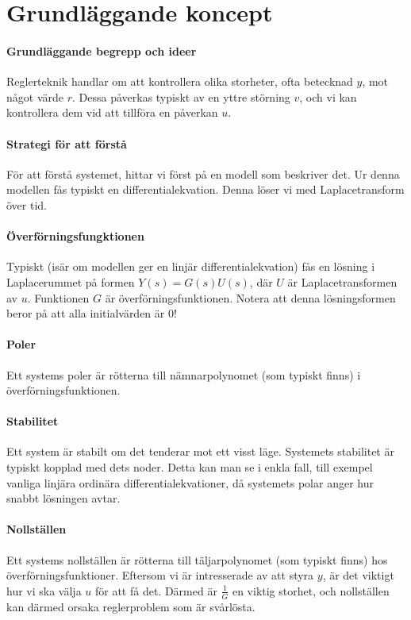 \section{Grundläggande koncept}

\paragraph{Grundläggande begrepp och ideer}
Reglerteknik handlar om att kontrollera olika storheter, ofta betecknad $y$, mot något värde $r$. Dessa påverkas typiskt av en yttre störning $v$, och vi kan kontrollera dem vid att tillföra en påverkan $u$.

\paragraph{Strategi för att förstå}
För att förstå systemet, hittar vi först på en modell som beskriver det. Ur denna modellen fås typiskt en differentialekvation. Denna löser vi med Laplacetransform över tid.

\paragraph{Överförningsfungktionen}
Typiskt (isär om modellen ger en linjär differentialekvation) fås en lösning i Laplacerummet på formen $Y(s) = G(s)U(s)$, där $U$ är Laplacetransformen av $u$. Funktionen $G$ är överförningsfunktionen. Notera att denna lösningsformen beror på att alla initialvärden är $0$!

\paragraph{Poler}
Ett systems poler är rötterna till nämnarpolynomet (som typiskt finns) i överförningsfunktionen.

\paragraph{Stabilitet}
Ett system är stabilt om det tenderar mot ett visst läge. Systemets stabilitet är typiskt kopplad med dets noder. Detta kan man se i enkla fall, till exempel vanliga linjära ordinära differentialekvationer, då systemets polar anger hur snabbt lösningen avtar.

\paragraph{Nollställen}
Ett systems nollställen är rötterna till täljarpolynomet (som typiskt finns) hos överförningsfunktioner. Eftersom vi är intresserade av att styra $y$, är det viktigt hur vi ska välja $u$ för att få det. Därmed är $\frac{1}{G}$ en viktig storhet, och nollställen kan därmed orsaka reglerproblem som är svårlösta.

